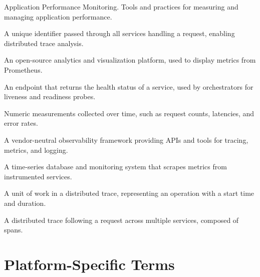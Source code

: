 \begin{description}[style=nextline,leftmargin=2cm,labelwidth=1.8cm]

\item[APM]
Application Performance Monitoring. Tools and practices for measuring and managing application performance.

\item[Correlation ID]
A unique identifier passed through all services handling a request, enabling distributed trace analysis.

\item[Grafana]
An open-source analytics and visualization platform, used to display metrics from Prometheus.

\item[Health Check]
An endpoint that returns the health status of a service, used by orchestrators for liveness and readiness probes.

\item[Metrics]
Numeric measurements collected over time, such as request counts, latencies, and error rates.

\item[OpenTelemetry (OTel)]
A vendor-neutral observability framework providing APIs and tools for tracing, metrics, and logging.

\item[Prometheus]
A time-series database and monitoring system that scrapes metrics from instrumented services.

\item[Span]
A unit of work in a distributed trace, representing an operation with a start time and duration.

\item[Trace]
A distributed trace following a request across multiple services, composed of spans.

\end{description}

\section{Platform-Specific Terms}
\label{app:glossary:platform}


